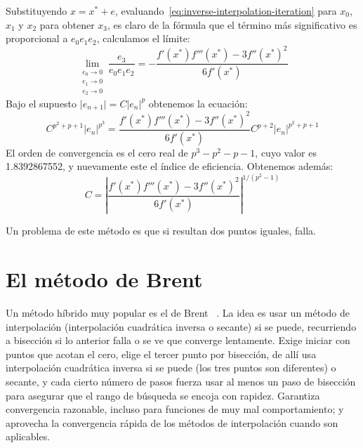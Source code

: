   Substituyendo \(x = x^* + e\),
  evaluando~\eqref{eq:inverse-interpolation-iteration}
  para \(x_0\), \(x_1\) y \(x_2\) para obtener \(x_3\),
  es claro de la fórmula que el término más significativo
  es proporcional a \(e_0 e_1 e_2\),
  calculamos el límite:
  \begin{equation*}
    \lim_{\substack{e_0 \to 0 \\
                    e_1 \to 0 \\
                    e_2 \to 0}} \frac{e_3}{e_0 e_1 e_2}
      = - \frac{f'(x^*) f'''(x^*) - 3 f''(x^*)^2}{6 f'(x^*)}
  \end{equation*}
  Bajo el supuesto \(\lvert e_{n + 1} \rvert = C \lvert e_n \rvert^p\)
  obtenemos la ecuación:
  \begin{equation*}
    C^{p^2 + p + 1} \lvert e_n \rvert^{p^3}
      = \frac{f'(x^*) f'''(x^*) - 3 f''(x^*)^2}{6 f'(x^*)}
           C^{p + 2} \lvert e_n \rvert^{p^2 + p + 1}
  \end{equation*}
  El orden de convergencia es el cero real de \(p^3 - p^2 - p - 1\),
  cuyo valor es \num{1,8392867552},
  y nuevamente este el índice de eficiencia.
  Obtenemos además:
  \begin{equation*}
    C
      = \left\lvert
          \frac{f'(x^*) f'''(x^*) - 3 f''(x^*)^2}{6 f'(x^*)}
        \right\rvert^{1/(p^2 - 1)}
  \end{equation*}

  Un problema de este método es que si resultan dos puntos iguales,
  falla.

\section{El método de Brent}
\label{sec:metodo-Brent}

  Un método híbrido muy popular es el de Brent~%
    \cite[capítulo~4]{brent73:_algo_min_no_derivatives}.
  La idea es usar un método de interpolación
  (interpolación cuadrática inversa o secante)
  si se puede,
  recurriendo a bisección si lo anterior falla
  o se ve que converge lentamente.
  Exige iniciar con puntos que acotan el cero,
  elige el tercer punto por bisección,
  de allí usa interpolación cuadrática inversa si se puede
  (los tres puntos son diferentes)
  o secante,
  y cada cierto número de pasos fuerza usar al menos un paso de bisección
  para asegurar que el rango de búsqueda se encoja con rapidez.
  Garantiza convergencia razonable,
  incluso para funciones de muy mal comportamiento;
  y aprovecha la convergencia rápida de los métodos de interpolación
  cuando son aplicables.

